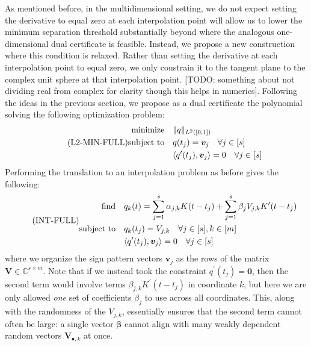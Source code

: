 \documentclass[11pt]{article}
\newcommand{\ra}{\rangle}
\newcommand{\la}{\langle}
\newcommand{\CC}{\mathbb{C}}
\newcommand{\HS}{\hspace{3.5mm}}
\newcommand{\bV}{\bm V}
\newcommand{\bv}{\bm v}
\newcounter{para}
\begin{document}
As mentioned before, in the multidimensional setting, we do not expect setting the derivative to equal zero at each interpolation point will allow us to lower the minimum separation threshold substantially beyond where the analogous one-dimensional dual certificate is feasible.
Instead, we propose a new construction where this condition is relaxed.
Rather than setting the derivative at each interpolation point to equal zero, we only constrain it to the tangent plane to the complex unit sphere at that interpolation point.
[TODO: something about not dividing real from complex for clarity though this helps in numerics].
Following the ideas in the previous section, we propose as a dual certificate the polynomial solving the following optimization problem:
\begin{equation}
    \tag{L2-MIN-FULL}
    \begin{aligned}
  \text{minimize} &\HS \|q\|_{L^2([0, 1])} \\
  \text{subject to} &\HS q(t_j) = \bv_j \HS \forall j \in [s] \\
                  &\HS \la q^\prime(t_j), \bv_j \ra = 0 \HS \forall j \in [s]
              \end{aligned}
          \end{equation}
Performing the translation to an interpolation problem as before gives the following:
\begin{equation}
    \tag{INT-FULL}
    \begin{aligned}
  \text{find} &\HS q_k(t) = \sum_{j = 1}^s \alpha_{j, k} K(t - t_j) + \sum_{j = 1}^s \beta_jV_{j, k} K^\prime(t - t_j) \\
  \text{subject to} &\HS q_k(t_j) = V_{j, k} \HS \forall j \in [s], k \in [m] \\
  &\HS \la q^\prime(t_j), \bv_j \ra = 0 \HS \forall j \in [s]
\end{aligned}
\end{equation}
where we organize the sign pattern vectors $\bv_j$ as the rows of the matrix $\bV \in \CC^{s \times m}$.
Note that if we instead took the constraint $q^\prime(t_j) = \bm 0$, then the second term would involve terms $\beta_{j, k}K^\prime(t - t_j)$ in coordinate $k$, but here we are only allowed \emph{one} set of coefficients $\beta_j$ to use across all coordinates.
This, along with the randomness of the $V_{j, k}$, essentially ensures that the second term cannot often be large: a single vector $\bm \beta$ cannot align with many weakly dependent random vectors $\bV_{\bullet, k}$ at once.
\end{document}
